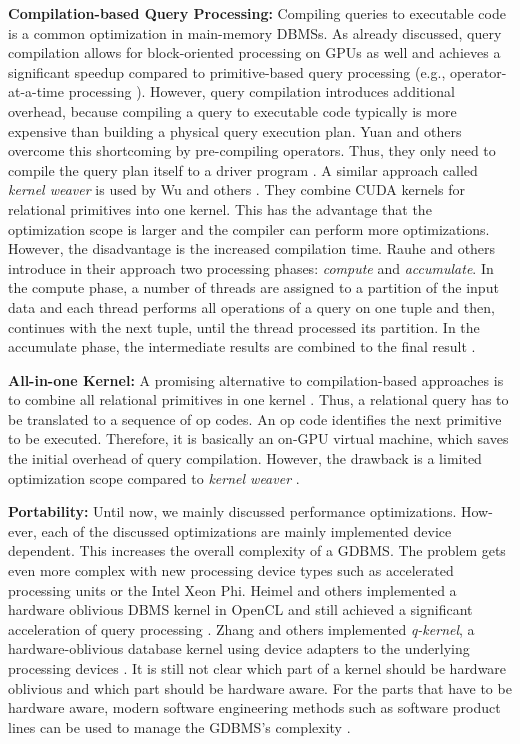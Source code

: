 \documentclass[twocolumn]{article}
\begin{document}
\noindent
\textbf{Compilation-based Query Processing:} 
Compiling queries to executable code is a common optimization in main-memory DBMSs. 
As already discussed, query compilation allows for block-oriented processing on GPUs as well and achieves a significant speedup compared to primitive-based query processing (e.g., operator-at-a-time processing \cite{He:2009}). 
However, query compilation introduces additional overhead, because compiling a query to executable code typically is more expensive than building a physical query execution plan. Yuan and others overcome this shortcoming by pre-compiling operators. Thus, they only need to compile the query plan itself to a driver program \cite{Yuan:2013}. 
A similar approach called \textit{kernel weaver} is used by Wu and others \cite{Wu:2012}. 
They combine CUDA kernels for relational primitives into one kernel. This has the advantage that the optimization scope is larger and the compiler can perform more optimizations. However, the disadvantage is the increased compilation time. Rauhe and others introduce in their approach two processing phases: \textit{compute} and \textit{accumulate}. In the compute phase, a number of threads are assigned to a partition of the input data and each thread performs all operations of a query on one tuple and then, continues with the next tuple, until the thread processed its partition. 
In the accumulate phase, the intermediate results are combined to the final result \cite{Rauhe:2013}.

\noindent
\textbf{All-in-one Kernel:} 
A promising alternative to compilation-based approaches is to combine all relational primitives in one kernel \cite{Bakkum:2012}. Thus, a relational query has to be translated to a sequence of op codes. An op code identifies the next primitive to be executed. Therefore, it is basically an on-GPU virtual machine, which saves the initial overhead of query compilation. However, the drawback is a limited optimization scope compared to \textit{kernel weaver}  \cite{Wu:2012}.

\noindent
\textbf{Portability:} 
Until now, we mainly discussed performance optimizations. How- ever, each of the discussed optimizations are mainly implemented device dependent. This increases the overall complexity of a GDBMS. The problem gets even more complex with new processing device types such as accelerated processing units or the Intel Xeon Phi. Heimel and others implemented a hardware oblivious DBMS kernel in OpenCL and still achieved a significant acceleration of query processing \cite{Heimel:2013}. 
Zhang and others implemented \textit{q-kernel}, a hardware-oblivious database kernel using device adapters to the underlying processing devices \cite{Zhang:2013}. It is still not clear which part of a kernel should be hardware oblivious and which part should be hardware aware. 
For the parts that have to be hardware aware, modern software engineering methods such as software product lines can be used to manage the GDBMS’s complexity \cite{Broneske:2014}.
\end{document}
